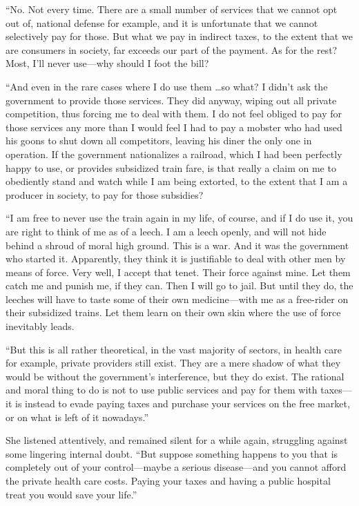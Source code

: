 ``No. Not every time. There are a small number of services that we cannot opt out of, national defense for example, and it is unfortunate that we cannot selectively pay for those. But what we pay in indirect taxes, to the extent that we are consumers in society, far exceeds our part of the payment. As for the rest? Most, I'll never use---why should I foot the bill?

``And even in the rare cases where I do use them \ldots so what? I didn't ask the government to provide those services. They did anyway, wiping out all private competition, thus forcing me to deal with them. I do not feel obliged to pay for those services any more than I would feel I had to pay a mobster who had used his goons to shut down all competitors, leaving his diner the only one in operation. If the government nationalizes a railroad, which I had been perfectly happy to use, or provides subsidized train fare, is that really a claim on me to obediently stand and watch while I am being extorted, to the extent that I am a producer in society, to pay for those subsidies?

``I am free to never use the train again in my life, of course, and if I do use it, you are right to think of me as of a leech. I am a leech openly, and will not hide behind a shroud of moral high ground. This is a war. And it was the government who started it. Apparently, they think it is justifiable to deal with other men by means of force. Very well, I accept that tenet. Their force against mine. Let them catch me and punish me, if they can. Then I will go to jail. But until they do, the leeches will have to taste some of their own medicine---with me as a free-rider on their subsidized trains. Let them learn on their own skin where the use of force inevitably leads.

``But this is all rather theoretical, in the vast majority of sectors, in health care for example, private providers still exist. They are a mere shadow of what they would be without the government's interference, but they do exist. The rational and moral thing to do is not to use public services and pay for them with taxes---it is instead to evade paying taxes and purchase your services on the free market, or on what is left of it nowadays.''

She listened attentively, and remained silent for a while again, struggling against some lingering internal doubt. ``But suppose something happens to you that is completely out of your control---maybe a serious disease---and you cannot afford the private health care costs. Paying your taxes and having a public hospital treat you would save your life.''

